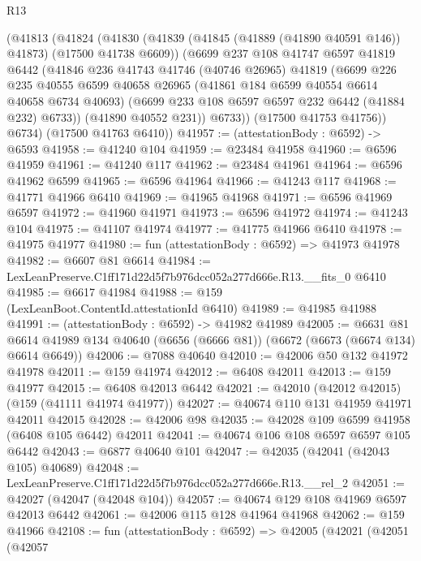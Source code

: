 \begin{lexlean}{R13}
\begin{coremodule}
      (@41813
        (@41824
          (@41830
            (@41839 (@41845 (@41889 (@41890 @40591 @146)) @41873) (@17500 @41738 @6609))
            (@6699
              @237
              @108
              @41747
              @6597
              @41819
              @6442
              (@41846
                @236
                @41743
                @41746
                (@40746 @26965)
                @41819
                (@6699
                  @226
                  @235
                  @40555
                  @6599
                  @40658
                  @26965
                  (@41861 @184 @6599 @40554 @6614 @40658 @6734 @40693)
                  (@6699 @233 @108 @6597 @6597 @232 @6442 (@41884 @232) @6733))
                (@41890 @40552 @231))
              @6733))
          (@17500 @41753 @41756))
        @6734)
      (@17500 @41763 @6410))
@41957 := (attestationBody : @6592) -> @6593
@41958 := @41240 @104
@41959 := @23484 @41958
@41960 := @6596 @41959
@41961 := @41240 @117
@41962 := @23484 @41961
@41964 := @6596 @41962 @6599
@41965 := @6596 @41964
@41966 := @41243 @117
@41968 := @41771 @41966 @6410
@41969 := @41965 @41968
@41971 := @6596 @41969 @6597
@41972 := @41960 @41971
@41973 := @6596 @41972
@41974 := @41243 @104
@41975 := @41107 @41974
@41977 := @41775 @41966 @6410
@41978 := @41975 @41977
@41980 := fun (attestationBody : @6592) => @41973 @41978
@41982 := @6607 @81 @6614
@41984 := LexLeanPreserve.C1ff171d22d5f7b976dcc052a277d666e.R13.__fits_0 @6410
@41985 := @6617 @41984
@41988 := @159 (LexLeanBoot.ContentId.attestationId @6410)
@41989 := @41985 @41988
@41991 := (attestationBody : @6592) -> @41982 @41989
@42005 := @6631
    @81
    @6614
    @41989
    @134
    @40640
    (@6656 (@6666 @81))
    (@6672 (@6673 (@6674 @134) @6614 @6649))
@42006 := @7088 @40640
@42010 := @42006 @50 @132 @41972 @41978
@42011 := @159 @41974
@42012 := @6408 @42011
@42013 := @159 @41977
@42015 := @6408 @42013 @6442
@42021 := @42010 (@42012 @42015) (@159 (@41111 @41974 @41977))
@42027 := @40674 @110 @131 @41959 @41971 @42011 @42015
@42028 := @42006 @98
@42035 := @42028 @109 @6599 @41958 (@6408 @105 @6442) @42011
@42041 := @40674 @106 @108 @6597 @6597 @105 @6442
@42043 := @6877 @40640 @101
@42047 := @42035 (@42041 (@42043 @105) @40689)
@42048 := LexLeanPreserve.C1ff171d22d5f7b976dcc052a277d666e.R13.__rel_2
@42051 := @42027 (@42047 (@42048 @104))
@42057 := @40674 @129 @108 @41969 @6597 @42013 @6442
@42061 := @42006 @115 @128 @41964 @41968
@42062 := @159 @41966
@42108 := fun (attestationBody : @6592) =>
  @42005
    (@42021
      (@42051
        (@42057

\end{coremodule}
\end{lexlean}
